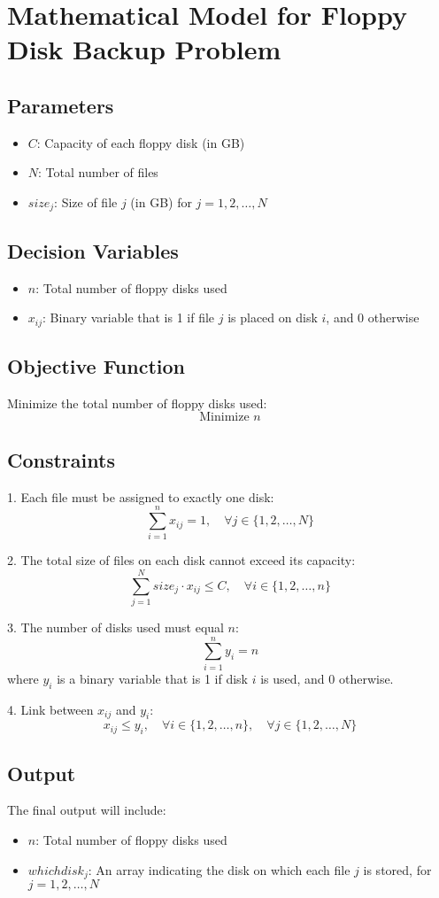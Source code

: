 \documentclass{article}
\begin{document}
\section*{Mathematical Model for Floppy Disk Backup Problem}

\subsection*{Parameters}
\begin{itemize}
    \item \( C \): Capacity of each floppy disk (in GB)
    \item \( N \): Total number of files
    \item \( size_j \): Size of file \( j \) (in GB) for \( j = 1, 2, \ldots, N \)
\end{itemize}

\subsection*{Decision Variables}
\begin{itemize}
    \item \( n \): Total number of floppy disks used
    \item \( x_{ij} \): Binary variable that is 1 if file \( j \) is placed on disk \( i \), and 0 otherwise
\end{itemize}

\subsection*{Objective Function}
Minimize the total number of floppy disks used:
\[
\text{Minimize } n
\]

\subsection*{Constraints}
1. Each file must be assigned to exactly one disk:
\[
\sum_{i=1}^{n} x_{ij} = 1, \quad \forall j \in \{1, 2, \ldots, N\}
\]

2. The total size of files on each disk cannot exceed its capacity:
\[
\sum_{j=1}^{N} size_j \cdot x_{ij} \leq C, \quad \forall i \in \{1, 2, \ldots, n\}
\]

3. The number of disks used must equal \( n \):
\[
\sum_{i=1}^{n} y_i = n
\]
where \( y_i \) is a binary variable that is 1 if disk \( i \) is used, and 0 otherwise.

4. Link between \( x_{ij} \) and \( y_i \):
\[
x_{ij} \leq y_i, \quad \forall i \in \{1, 2, \ldots, n\}, \quad \forall j \in \{1, 2, \ldots, N\}
\]

\subsection*{Output}
The final output will include:
\begin{itemize}
    \item \( n \): Total number of floppy disks used
    \item \( whichdisk_j \): An array indicating the disk on which each file \( j \) is stored, for \( j = 1, 2, \ldots, N \)
\end{itemize}
\end{document}
